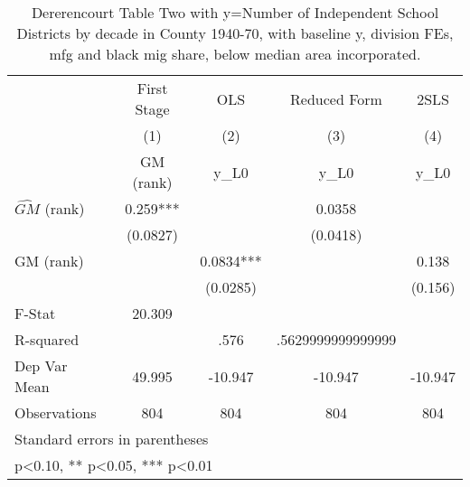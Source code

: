 \begin{table}[htbp]\centering
\def\sym#1{\ifmmode^{#1}\else\(^{#1}\)\fi}
\caption{Dererencourt Table Two with y=Number of Independent School Districts by decade in County 1940-70, with baseline y, division FEs, mfg and black mig share, below median area incorporated.}
\begin{tabular}{l*{4}{c}}
\toprule
                    & First Stage   &         OLS   &Reduced Form   &        2SLS   \\
                    &\multicolumn{1}{c}{(1)}&\multicolumn{1}{c}{(2)}&\multicolumn{1}{c}{(3)}&\multicolumn{1}{c}{(4)}\\
                    &\multicolumn{1}{c}{GM  (rank)}&\multicolumn{1}{c}{y\_L0}&\multicolumn{1}{c}{y\_L0}&\multicolumn{1}{c}{y\_L0}\\
\midrule
$\hat{GM}$ (rank)   &       0.259***&               &      0.0358   &               \\
                    &    (0.0827)   &               &    (0.0418)   &               \\
\addlinespace
GM  (rank)          &               &      0.0834***&               &       0.138   \\
                    &               &    (0.0285)   &               &     (0.156)   \\
\midrule
F-Stat              &      20.309   &               &               &               \\
R-squared           &               &        .576   &.5629999999999999   &               \\
Dep Var Mean        &      49.995   &     -10.947   &     -10.947   &     -10.947   \\
Observations        &         804   &         804   &         804   &         804   \\
\bottomrule
\multicolumn{5}{l}{\footnotesize Standard errors in parentheses}\\
\multicolumn{5}{l}{\footnotesize * p<0.10, ** p<0.05, *** p<0.01}\\
\end{tabular}
\end{table}
